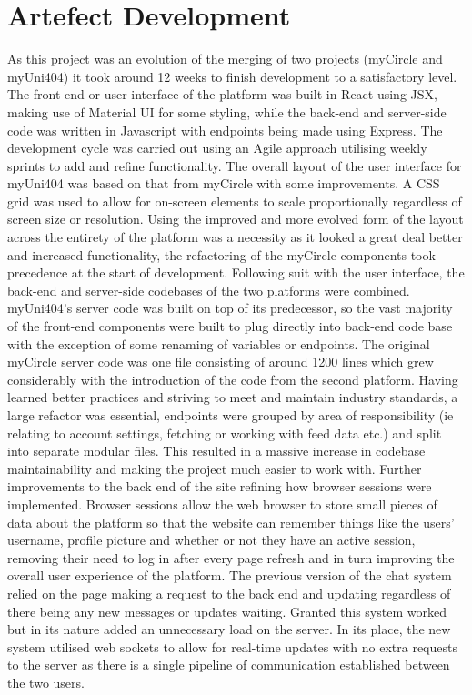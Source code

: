 \documentclass[lettersize,journal]{IEEEtran}
\begin{document}
\section{Artefect Development}
	As this project was an evolution of the merging of two projects (myCircle and myUni404) it took around 12 weeks to finish development to a satisfactory level. The front-end or user interface of
	the platform was built in React using JSX, making use of Material UI for some styling, while the back-end and server-side code was written in Javascript with endpoints being made using
	Express. The development cycle was carried out using an Agile approach utilising weekly sprints to add and refine functionality. The overall layout of the user interface for myUni404 was based 
	on that from myCircle with some	improvements. A CSS grid was used to allow for on-screen elements to scale proportionally regardless of screen size or resolution. Using the improved and more
	evolved form of the layout across the entirety of the platform was a necessity as it looked a great deal better and increased functionality, the refactoring of the myCircle components took
	precedence at the start of development.	Following suit with the user interface, the back-end and server-side codebases of the two platforms were combined. myUni404's server code was built on
	top of its predecessor, so the vast majority of the front-end components were built to plug directly into back-end code base with the exception of some renaming of variables or endpoints. The
	original myCircle server code was one file consisting of around 1200 lines which grew considerably with the introduction of the code from the second platform. Having learned better practices and
	striving to meet and maintain industry standards, a large refactor was essential, endpoints were grouped by area of responsibility (ie relating to account settings, fetching or working with feed
	data etc.) and split into separate modular files. This resulted in a massive increase in codebase maintainability and making the project much easier to work with. Further improvements to the
	back end of the site refining how browser sessions were implemented. Browser sessions allow the web browser to store small pieces of data about the platform so that the website can remember
	things like the users' username, profile picture and whether or not they have an active session, removing their need to log in after every page refresh and in turn improving the overall user
	experience of the platform. The previous version of the chat system relied on the page making a request to the back end and updating regardless	of there being any new messages or updates
	waiting. Granted this system worked but in its nature added an unnecessary load on the server. In its place, the new system utilised web sockets to allow for real-time updates with no extra
	requests to the server as there is a single pipeline of communication established between the two users.
\end{document}
